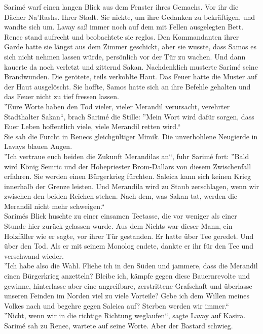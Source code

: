 Sarimé warf einen langen Blick aus dem Fenster ihres Gemachs. Vor ihr die Dächer Na'Rashs. Ihrer 
Stadt. Sie nickte, um ihre Gedanken zu bekräftigen, und wandte sich um. Lavay saß immer noch 
auf dem mit Fellen ausgelegten Bett. Renec stand aufrecht und beobachtete sie reglos. 
Den Kommandanten ihrer Garde hatte sie längst aus dem Zimmer geschickt, aber sie wusste, dass Samos 
es sich nicht nehmen lassen würde, persönlich vor der Tür zu wachen. Und dann kauerte da noch 
verletzt und zitternd Sakan. Nachdenklich musterte Sarimé seine Brandwunden. Die gerötete, teils 
verkohlte Haut. Das Feuer hatte die Muster auf der Haut ausgelöscht. Sie hoffte, Samos hatte sich 
an ihre Befehle gehalten und das Feuer nicht zu tief fressen lassen.\\
''Eure Worte haben den Tod vieler, vieler Merandil verursacht, verehrter Stadthalter Sakan``, brach 
Sarimé die Stille: ''Mein Wort wird dafür sorgen, dass Euer Leben hoffentlich viele, viele Merandil 
retten wird.``\\
Sie sah die Furcht in Renecs gleichgültiger Mimik. Die unverhohlene Neugierde in Lavays blauen 
Augen.\\
''Ich vertraue euch beiden die Zukunft Merandilas an``, fuhr Sarimé fort: ''Bald wird König Semric 
und der Hohepriester Brom-Dallars von diesem Zwischenfall erfahren. Sie werden einen Bürgerkrieg 
fürchten. Saleica kann sich keinen Krieg innerhalb der Grenze leisten. Und Merandila wird zu Staub 
zerschlagen, wenn wir zwischen den beiden Reichen stehen. Nach dem, was Sakan tat, werden die 
Merandil nicht mehr schweigen.``\\
Sarimés Blick huschte zu einer einsamen Teetasse, die vor weniger als einer Stunde hier zurück 
gelassen wurde. Aus dem Nichts war dieser Mann, ein Holzfäller wie er sagte, vor ihrer Tür 
gestanden. Er hatte über Tee geredet. Und über den Tod. Als er mit seinem Monolog endete, dankte er 
ihr für den Tee und verschwand wieder.\\
''Ich habe also die Wahl. Fliehe ich in den Süden und jammere, dass die Merandil einen Bürgerkrieg 
anzetteln? Bleibe ich, kämpfe gegen diese Bauernrevolte und gewinne, hinterlasse aber eine 
angreifbare, zerstrittene Grafschaft und überlasse unseren Feinden im Norden viel zu viele 
Vorteile? Gebe ich dem Willen meines Volkes nach und begehre gegen Saleica auf? Sterben werden wir 
immer.``\\
''Nicht, wenn wir in die richtige Richtung weglaufen``, sagte Lavay auf Kasira.\\
Sarimé sah zu Renec, wartete auf seine Worte. Aber der Bastard schwieg.\\
